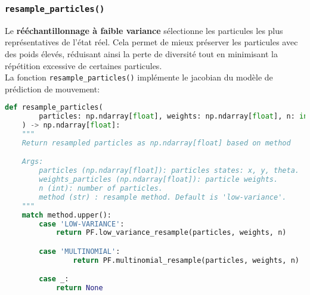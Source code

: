 \documentclass[../CSC_5RO12_TA_TP3.tex]{subfiles}
\begin{document}
\subsubsection{\texttt{resample\_particles()}}
\begin{definition}
    Le \textbf{rééchantillonnage à faible variance} sélectionne les particules les plus représentatives de l'état réel. Cela permet de mieux préserver les particules avec des poids élevés, réduisant ainsi la perte de diversité tout en minimisant la répétition excessive de certaines particules.\\

    \noindent La fonction \texttt{resample\_particles()} implémente le jacobian du modèle de prédiction de mouvement:
    \begin{scriptsize}\mycode
        \begin{lstlisting}[language=Python, caption=\texttt{resample\_particles()}]
def resample_particles(
        particles: np.ndarray[float], weights: np.ndarray[float], n: int, method: str = 'low-variance'
    ) -> np.ndarray[float]:
    """
    Return resampled particles as np.ndarray[float] based on method

    Args:
        particles (np.ndarray[float]): particles states: x, y, theta.
        weights_particles (np.ndarray[float]): particle weights.
        n (int): number of particles.
        method (str) : resample method. Default is 'low-variance'.
    """
    match method.upper():
        case 'LOW-VARIANCE':
            return PF.low_variance_resample(particles, weights, n)

        case 'MULTINOMIAL':
                return PF.multinomial_resample(particles, weights, n)

        case _:
            return None
        \end{lstlisting}
    \end{scriptsize}
\end{definition}
\end{document}
